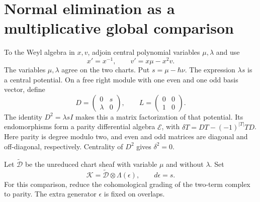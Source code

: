 \section{Normal elimination as a multiplicative global comparison}

To the Weyl algebra in $x,v$, adjoin central polynomial variables $\mu,\lambda$ and use
\[
 x'=x^{-1},\qquad v'=x\mu-x^2v.
\]
The variables $\mu,\lambda$ agree on the two charts.
Put $s=\mu-\hbar\nu$.
The expression $\lambda s$ is a central potential.
On a free right module with one even and one odd basis vector, define
\[
 D=\begin{pmatrix}0&s\\\lambda&0\end{pmatrix},\qquad
 L=\begin{pmatrix}0&0\\1&0\end{pmatrix}.
\]
The identity $D^2=\lambda s I$ makes this a matrix factorization of that potential.
Its endomorphisms form a parity differential algebra $\mathcal E$, with
$\delta T=DT-(-1)^{|T|}TD$.
Here parity is degree modulo two, and even and odd matrices are diagonal and off-diagonal, respectively.
Centrality of $D^2$ gives $\delta^2=0$.

Let $\widetilde{\mathcal D}$ be the unreduced chart sheaf with variable $\mu$ and without $\lambda$.
Set
\[
 \mathcal K=\widetilde{\mathcal D}\otimes\Lambda(\epsilon),
 \qquad d\epsilon=s.
\]
For this comparison, reduce the cohomological grading of the two-term complex to parity.
The extra generator $\epsilon$ is fixed on overlaps.

